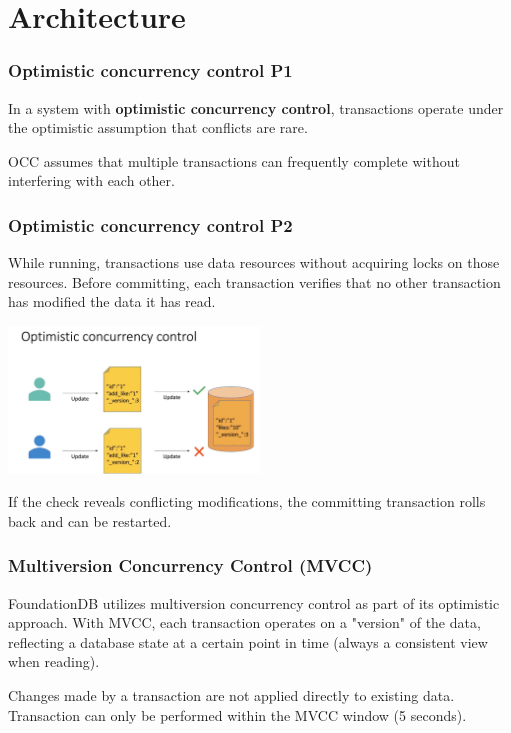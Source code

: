 \section{Architecture}

\begin{frame}
	\frametitle{Optimistic concurrency control P1}
 In a system with \textbf{optimistic concurrency control}, transactions operate under the optimistic assumption that conflicts are rare. 
\vspace{0.5cm}

 OCC assumes that multiple transactions can frequently complete without interfering with each other.
\end{frame}

\begin{frame}
	\frametitle{Optimistic concurrency control P2}
While running, transactions use data resources without acquiring locks on those resources. Before committing, each transaction verifies that no other transaction has modified the data it has read. 
\vspace{0.2cm}

\begin{center}
    \includegraphics[width=0.5\textwidth]{img/2-Architecture/Optimistic Concurrency Control.png}
\end{center}

If the check reveals conflicting modifications, the committing transaction rolls back and can be restarted.


\end{frame}

\begin{frame}
	\frametitle{Multiversion Concurrency Control (MVCC)}
  FoundationDB utilizes multiversion concurrency control as part of its optimistic approach. With MVCC, each transaction operates on a "version" of the data, reflecting a database state at a certain point in time (always a consistent view when reading).
  \vspace{0.5cm}
  
  Changes made by a transaction are not applied directly to existing data.
  Transaction can only be performed within the MVCC window (5 seconds).
\end{frame}


